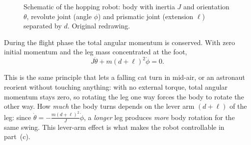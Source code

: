 \documentclass[11pt,a4paper]{article}
\theoremstyle{definition}
\theoremstyle{plain}
\theoremstyle{remark}
\begin{document}
\begin{figure}[H]
\centering
{}
\caption{Schematic of the hopping robot: body with inertia $J$ and orientation $\theta$, revolute joint (angle $\phi$) and prismatic joint (extension $\ell$) separated by $d$. Original redrawing.}
\end{figure}

During the flight phase the total angular momentum is conserved. With zero initial momentum and the leg mass concentrated at the foot,
\begin{equation}
  J\dot\theta+m(d+\ell)^2\dot\phi=0 .
  \label{eq:hop-constraint}
\end{equation}

\begin{intuition}
This is the same principle that lets a falling cat turn in mid-air, or an astronaut reorient without touching anything: with no external torque, total angular momentum stays zero, so rotating the leg one way forces the body to rotate the other way. How \emph{much} the body turns depends on the lever arm $(d+\ell)$ of the leg: since $\dot\theta=-\frac{m(d+\ell)^2}{J}\dot\phi$, a \emph{longer} leg produces \emph{more} body rotation for the same swing. This lever-arm effect is what makes the robot controllable in part~(c).
\end{intuition}
\end{document}
